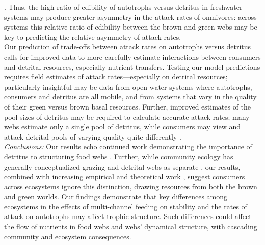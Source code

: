 \documentclass[12pt,a4paper,oneside]{article}
\begin{document}
\citep{Cebrian:2004}. Thus, the high ratio of edibility of
autotrophs versus detritus in freshwater
systems may produce greater asymmetry in the attack rates of
omnivores: across systems this relative ratio of edibility between the brown
and green webs may be key to predicting the relative asymmetry of attack rates.
\\
\indent Our prediction of trade-offs between attack rates on autotrophs versus
detritus calls for improved data to more 
carefully estimate interactions between
consumers and detrital resources, especially nutrient transfers. Testing our model predictions requires field estimates of
attack rates---especially on detrital resources; particularly
insightful may be data from 
open-water systems where autotrophs, consumers and detritus are all
mobile, and from systems that vary in the quality of their green versus brown
basal resources. Further, improved
estimates of the pool sizes of detritus may be required to calculate accurate attack rates; many webs estimate only a single pool of
detritus, while consumers may view and attack detrital pools of varying quality quite differently \citep{Wilson:2011qo}.
\\
\newline
\noindent \emph{Conclusions:} Our results echo continued work demonstrating the importance
of detritus to structuring food webs
\citep{Allesina:2009,Odum:1984}. Further, while community ecology has generally
conceptualized grazing and detrital webs as separate
\citep{Moore:2004}, our results, combined with increasing empirical
and theoretical work \citep{Anderson:2008, Vadeboncoeur:2005,
 Moore:1988,Blanchard:2011}, suggest consumers across ecosystems ignore this
distinction, drawing resources from both the brown and green
worlds. Our
findings demonstrate that key differences among ecosystems in the effects of multi-channel feeding on stability
and the rates of attack on autotrophs may affect trophic structure. Such differences could affect the flow of nutrients in food webs and webs' dynamical structure, with cascading community  and ecosystem consequences.\\


\end{document}
